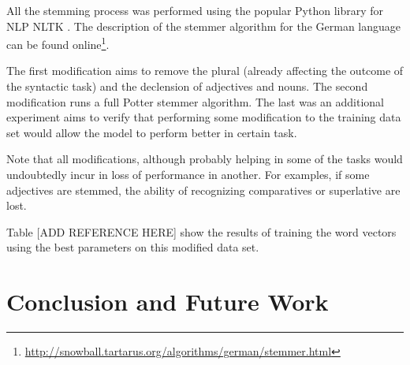 All the stemming process was performed using the popular Python library for
\ac{NLP} \ac{NLTK} \cite{BirdKleinLoper09}. The
description of the stemmer algorithm for the German language can be found
online\footnote{\url{http://snowball.tartarus.org/algorithms/german/stemmer.html}}.

The first modification aims to remove the plural (already affecting the
outcome of the syntactic task) and the declension of adjectives and nouns.
The second modification runs a full Potter stemmer algorithm. The last was an
additional experiment aims to verify that performing some modification to the
training data set would allow the model to perform better in certain task.

Note that all modifications, although probably helping in some of the tasks
would undoubtedly incur in loss of performance in another. For examples, if
some adjectives are stemmed, the ability of recognizing comparatives or
superlative are  lost.

Table [ADD REFERENCE HERE] show the results of training the word vectors
using the  best parameters on this modified data set.  




\section{Conclusion and Future Work}
\label{sec:conclusion_and_future_work}   








